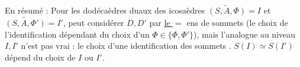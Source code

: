 En résumé : Pour les dodécaèdres  duaux
des icosaèdres $\widetilde{(S,A,\Phi)}=I$ et $\widetilde{(S,A,\Phi')}=I'$, 
peut considérer $D,D'$  par \uline{le $=$} ens
de sommets (le choix de l'identification 
dépendant  du choix d'un $\Phi\in\{\Phi,\Phi'\}$),
mais l'analogue au niveau $I,I'$ n'est
pas vrai : le choix d'une identification des
sommets . $S(I)\simeq S(I')$ dépend du choix de $I$ ou $I'$.
